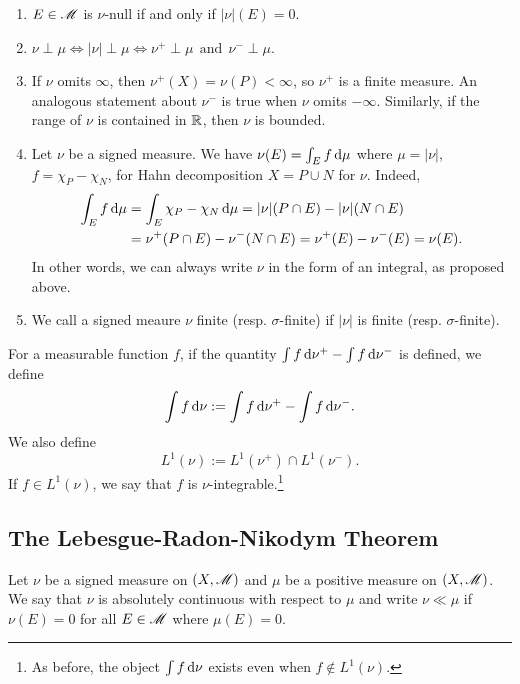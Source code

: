 \documentclass[12pt]{article} %
\begin{document}
\begin{remark}
    \begin{enumerate}
        \item $E \in \mathscr{M}$ is $\nu$-null if and only if $|\nu|(E) = 0$.
        \item $\nu \perp \mu \iff |\nu| \perp \mu \iff \nu^+ \perp \mu \ \ \text{and} \ \ \nu^- \perp \mu$.
        \item If $\nu$ omits $\infty$, then $\nu^+(X) = \nu(P) < \infty$, so $\nu^+$ is a finite measure. An analogous statement about $\nu^-$ is true when $\nu$ omits $-\infty$. Similarly, if the range of $\nu$ is contained in $\mathbb{R}$, then $\nu$ is bounded.
        \item Let $\nu$ be a signed measure. We have $\nu(E) = \int_E f \, \mathrm{d} \mu$ where $\mu = |\nu|$, $f = \chi_P - \chi_N$, for Hahn decomposition $X = P \cup N$ for $\nu$. Indeed, \begin{align*}
            \int_E f \, \mathrm{d} \mu &= \int_E \chi_P - \chi_N \, \mathrm{d} \mu  = |\nu|(P \cap E) - |\nu|(N \cap E) \\&= \nu^+(P \cap E) - \nu^-(N \cap E) = \nu^+(E) - \nu^-(E) = \nu(E).
        \end{align*}
        In other words, we can always write $\nu$ in the form of an integral, as proposed above.
        \item We call a signed meaure $\nu$ finite (resp. $\sigma$-finite) if $|\nu|$ is finite (resp. $\sigma$-finite).
    \end{enumerate}
\end{remark}

\begin{definition}
    For a measurable function $f$, if the quantity $\int f \, \mathrm{d} \nu^+ - \int f \, \mathrm{d} \nu^-$ is defined, we define \[\int f \, \mathrm{d} \nu := \int f \, \mathrm{d} \nu^+ - \int f \, \mathrm{d} \nu^-.\] We also define \[L^1(\nu) := L^1(\nu^+) \cap L^1(\nu^-).\]
    If $f \in L^1(\nu)$, we say that $f$ is $\nu$-integrable.\footnote{As before, the object $\int f \, \mathrm{d} \nu$ exists even when $f \notin L^1(\nu)$. }
\end{definition}

\subsection{The Lebesgue-Radon-Nikodym Theorem}

\begin{definition}
    Let $\nu$ be a signed measure on $(X, \mathscr{M})$ and $\mu$ be a positive measure on $(X, \mathscr{M})$. We say that $\nu$ is absolutely continuous with respect to $\mu$ and write $\nu \ll \mu$ if $\nu(E) = 0$ for all $E \in \mathscr{M}$ where $\mu(E) = 0$.
\end{definition}
\end{document}
